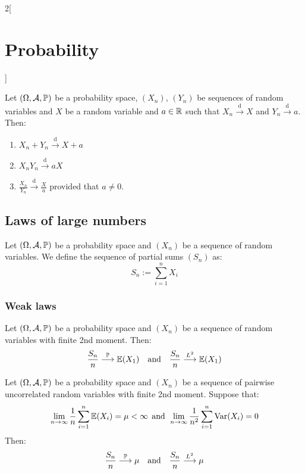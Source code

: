 \documentclass[../../../main_math.tex]{subfiles}
\begin{document}
\begin{multicols}{2}[\section{Probability}]
\begin{corollary}
\begin{enumerate}
    \end{enumerate}
  \end{corollary}
  \begin{theorem}
    Let $(\Omega,\mathcal{A},\mathbb{P})$ be a probability space, $(X_n)$, $(Y_n)$ be sequences of random variables and $X$ be a random variable and $a\in\mathbb{R}$ such that $X_n\overset{\text{d}}{\longrightarrow} X$ and $Y_n\overset{\text{d}}{\longrightarrow} a$. Then:
    \begin{enumerate}
      \item $X_n+Y_n\overset{\text{d}}{\longrightarrow} X+ a$
      \item $X_nY_n\overset{\text{d}}{\longrightarrow} aX$
      \item $\frac{X_n}{Y_n}\overset{\text{d}}{\longrightarrow} \frac{X}{a}$ provided that $a\ne 0$.
    \end{enumerate}
  \end{theorem}
  \subsection{Laws of large numbers}
  \begin{definition}
    Let $(\Omega,\mathcal{A},\mathbb{P})$ be a probability space and $(X_n)$ be a sequence of random variables. We define the sequence of partial sums $(S_n)$ as: $$S_n:=\sum_{i=1}^nX_i$$
  \end{definition}
  \subsubsection{Weak laws}
  \begin{theorem}
    Let $(\Omega,\mathcal{A},\mathbb{P})$ be a probability space and $(X_n)$ be a sequence of \iid random variables with finite 2nd moment. Then: $$\frac{S_n}{n}\overset{\mathbb{P}}{\longrightarrow}\mathbb{E}(X_1)\quad\text{and}\quad\frac{S_n}{n}\overset{L^2}{\longrightarrow}\mathbb{E}(X_1)$$
  \end{theorem}
  \begin{theorem}
    Let $(\Omega,\mathcal{A},\mathbb{P})$ be a probability space and $(X_n)$ be a sequence of pairwise uncorrelated random variables with finite 2nd moment. Suppose that: $$\lim_{n\to\infty}\frac{1}{n}\sum_{i=1}^n\mathbb{E}(X_i)=\mu<\infty\;\,\text{and}\;\,\lim_{n\to\infty}\frac{1}{n^2}\sum_{i=1}^n\mathrm{Var}(X_i)=0$$ Then: $$\frac{S_n}{n}\overset{\mathbb{P}}{\longrightarrow}\mu\quad\text{and}\quad\frac{S_n}{n}\overset{L^2}{\longrightarrow}\mu$$
  \end{theorem}

\end{multicols}
\end{document}
